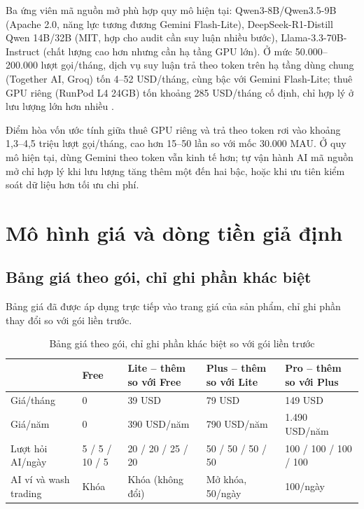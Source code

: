 Ba ứng viên mã nguồn mở phù hợp quy mô hiện tại: Qwen3-8B/Qwen3.5-9B (Apache 2.0, năng lực tương đương Gemini Flash-Lite), DeepSeek-R1-Distill Qwen 14B/32B (MIT, hợp cho audit cần suy luận nhiều bước), Llama-3.3-70B-Instruct (chất lượng cao hơn nhưng cần hạ tầng GPU lớn). Ở mức 50.000--200.000 lượt gọi/tháng, dịch vụ suy luận trả theo token trên hạ tầng dùng chung (Together AI, Groq) tốn 4--52 USD/tháng, cùng bậc với Gemini Flash-Lite; thuê GPU riêng (RunPod L4 24GB) tốn khoảng 285 USD/tháng cố định, chỉ hợp lý ở lưu lượng lớn hơn nhiều \cite{together-ai-pricing, groq-pricing, runpod-pricing, aws-g5-instance}.

Điểm hòa vốn ước tính giữa thuê GPU riêng và trả theo token rơi vào khoảng 1,3--4,5 triệu lượt gọi/tháng, cao hơn 15--50 lần so với mốc 30.000 MAU. Ở quy mô hiện tại, dùng Gemini theo token vẫn kinh tế hơn; tự vận hành AI mã nguồn mở chỉ hợp lý khi lưu lượng tăng thêm một đến hai bậc, hoặc khi ưu tiên kiểm soát dữ liệu hơn tối ưu chi phí.

\section{Mô hình giá và dòng tiền giả định}

\subsection{Bảng giá theo gói, chỉ ghi phần khác biệt}

Bảng giá đã được áp dụng trực tiếp vào trang giá của sản phẩm, chỉ ghi phần thay đổi so với gói liền trước.

\begin{table}[H]
\centering
\small
\caption{Bảng giá theo gói, chỉ ghi phần khác biệt so với gói liền trước}
\label{tab:pricing-tiers}
\begin{tabularx}{\textwidth}{|p{2.6cm}|X|X|X|X|}
\hline
 & \textbf{Free} & \textbf{Lite} -- thêm so với Free & \textbf{Plus} -- thêm so với Lite & \textbf{Pro} -- thêm so với Plus \\
\hline
Giá/tháng & 0 & 39 USD & 79 USD & 149 USD \\
\hline
Giá/năm & 0 & 390 USD/năm & 790 USD/năm & 1.490 USD/năm \\
\hline
Lượt hỏi AI/ngày & 5 / 5 / 10 / 5 & 20 / 20 / 25 / 20 & 50 / 50 / 50 / 50 & 100 / 100 / 100 / 100 \\
\hline
AI ví và wash trading & Khóa & Khóa (không đổi) & Mở khóa, 50/ngày & 100/ngày \\
\hline
\end{tabularx}
\end{table}

